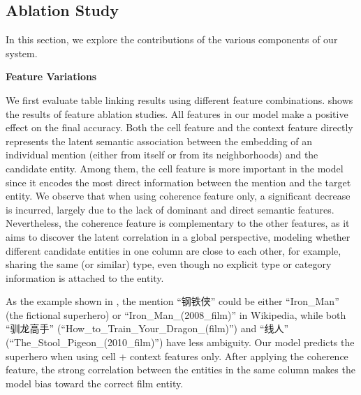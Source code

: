 \subsection{Ablation Study}
\label{sec:exp-ablation}

In this section, we explore the contributions of the various components of our system.


\noindent
\textbf{Feature Variations}

We first evaluate table linking results using different feature combinations.
 shows the results of feature ablation studies.
All features in our model make a positive effect on the final accuracy.
Both the cell feature and the context feature directly represents
the latent semantic association between the embedding of an individual mention
(either from itself or from its neighborhoods) and the candidate entity.
Among them, the cell feature is more important in the model since it encodes
the most direct information between the mention and the target entity.
We observe that when using coherence feature only, a significant decrease is incurred,
largely due to the lack of dominant and direct semantic features.
Nevertheless, the coherence feature is complementary to the other features,
as it aims to discover the latent correlation in a global perspective,
modeling whether different candidate entities in one column 
are close to each other, for example, sharing the same (or similar) type,
even though no explicit type or category information is attached to the entity.

As the example shown in , the mention 
``钢铁侠'' could be either
``Iron\_Man'' (the fictional superhero) or ``Iron\_Man\_(2008\_film)'' 
in Wikipedia, while both ``驯龙高手'' (``How\_to\_Train\_Your\_Dragon\_(film)'') and
``线人'' (``The\_Stool\_Pigeon\_(2010\_film)'') have less ambiguity.
Our model predicts the superhero when using cell + context features only.
After applying the coherence feature, 
the strong correlation between the entities in the same column
makes the model bias toward the correct film entity.


